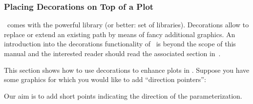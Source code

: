 \subsubsection{Placing Decorations on Top of a Plot}
{
%

\tikzname\ comes with the powerful  library (or better: set of libraries). Decorations allow to replace or extend an existing path by means of fancy additional graphics. An introduction into the decorations functionality of \tikzname\ is beyond the scope of this manual and the interested reader should read the associated section in~\cite{tikz}.

This section shows how to use decorations to enhance plots in \PGFPlots.
Suppose you have some graphics for which you would like to add ``direction pointers'':
\begin{codeexample}[]
\end{codeexample}
\noindent Our aim is to add short points indicating the direction of the parameterization. 

}
